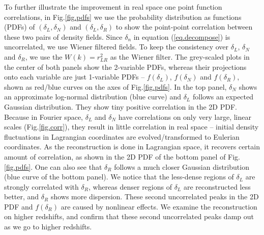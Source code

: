 \documentclass[aps,prd,twocolumn,superscriptaddress,amsfont,amssymb,amsmath,nofootinbib,showpacs,balancelastpage]{revtex4-1}
\begin{document}
To further illustrate the improvement in real space
one point function correlations,
in Fig.\ref{fig.pdfs} we use the probability distribution
as functions (PDFs) of $(\delta_L,\delta_N)$ and $(\delta_L,\delta_R)$
to show the point-point correlation between these two pairs of density
fields. Since $\delta_n$ in equation (\ref{eq.decompose}) is
uncorrelated, we use Wiener filtered fields. To keep the
consistency over $\delta_L$, $\delta_N$ and $\delta_R$, we
use the $W(k)=r^2_{LR}$ as the Wiener filter.
The grey-scaled plots in the center of both panels show the 2-variable PDFs,
whereas their projections onto each variable are just
1-variable PDFs -- $f(\delta_L)$, $f(\delta_N)$ and $f(\delta_R)$, shown
as red/blue curves on the axes of Fig.\ref{fig.pdfs}.
In the top panel, $\delta_N$ shows an approximate log-normal
distribution (blue curve) and $\delta_L$ follows an expected
Gaussian distribution. They show tiny positive correlation in the
2D PDF.
Because in Fourier space, $\delta_L$ and $\delta_N$ have
correlations on only very large, linear scales (Fig.\ref{fig.corr}),
they result in little correlation in real space -- initial density fluctuations
in Lagrangian coordinates are evolved/transformed to Eulerian coordinates.
As the reconstruction is done in Lagrangian space, it recovers
certain amount of correlation, as shown in the 2D PDF of the bottom panel
of Fig.\ref{fig.pdfs}. One can also see that $\delta_R$ follows
a much closer Gaussian distribution (blue curve of the bottom panel).
We notice that the less-dense regions of $\delta_L$ are strongly
correlated with $\delta_R$, whereas denser regions of $\delta_L$ are
reconstructed less better, and $\delta_R$ shows more dispersion.
These second uncorrelated peaks in the 2D PDF and $f(\delta_R)$
are caused by nonlinear effects. We examine the reconstruction on
higher redshifts, and confirm that these second uncorrelated peaks
damp out as we go to higher redshifts.
\end{document}
